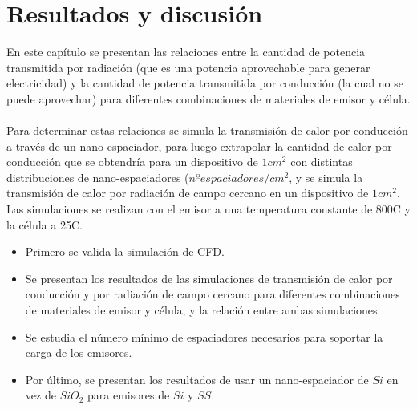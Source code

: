 \chapter{Resultados y discusión}
En este capítulo se presentan las relaciones entre la cantidad de potencia transmitida por radiación (que es una potencia aprovechable para generar electricidad) y la cantidad de potencia transmitida por conducción (la cual no se puede aprovechar) para diferentes combinaciones de materiales de emisor y célula.\\\\
Para determinar estas relaciones se simula la transmisión de calor por conducción a través de un nano-espaciador, para luego extrapolar la cantidad de calor por conducción que se obtendría para un dispositivo de $1cm^2$ con distintas distribuciones de nano-espaciadores ($nº espaciadores/cm^2$, y se simula la transmisión de calor por radiación de campo cercano en un dispositivo de $1cm^2$. Las simulaciones se realizan con el emisor a una temperatura constante de 800\textdegree C y la célula a 25\textdegree C.
\begin{itemize}
	\item Primero se valida la simulación de CFD.
	\item Se presentan los resultados de las simulaciones de transmisión de calor por conducción y por radiación de campo cercano para diferentes combinaciones de materiales de emisor y célula, y la relación entre ambas simulaciones.
	\item Se estudia el número mínimo de espaciadores necesarios para soportar la carga de los emisores.
	\item Por último, se presentan los resultados de usar un nano-espaciador de $Si$ en vez de $SiO_2$ para emisores de $Si$ y $SS$.
\end{itemize}
